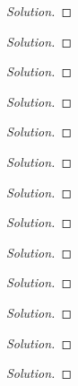 \begin{problem}
\end{problem}
\begin{proof}[Solution]
\end{proof}

\begin{problem}
\end{problem}
\begin{proof}[Solution]
\end{proof}

\begin{problem}
\end{problem}
\begin{proof}[Solution]
\end{proof}

\begin{problem}
\end{problem}
\begin{proof}[Solution]
\end{proof}

\begin{problem}
\end{problem}
\begin{proof}[Solution]
\end{proof}

\begin{problem}
\end{problem}
\begin{proof}[Solution]
\end{proof}

\begin{problem}
\end{problem}
\begin{proof}[Solution]
\end{proof}

\begin{problem}
\end{problem}
\begin{proof}[Solution]
\end{proof}

\begin{problem}
\end{problem}
\begin{proof}[Solution]
\end{proof}

\begin{problem}
\end{problem}
\begin{proof}[Solution]
\end{proof}

\begin{problem}
\end{problem}
\begin{proof}[Solution]
\end{proof}

\begin{problem}
\end{problem}
\begin{proof}[Solution]
\end{proof}

\begin{problem}
\end{problem}
\begin{proof}[Solution]
\end{proof}

